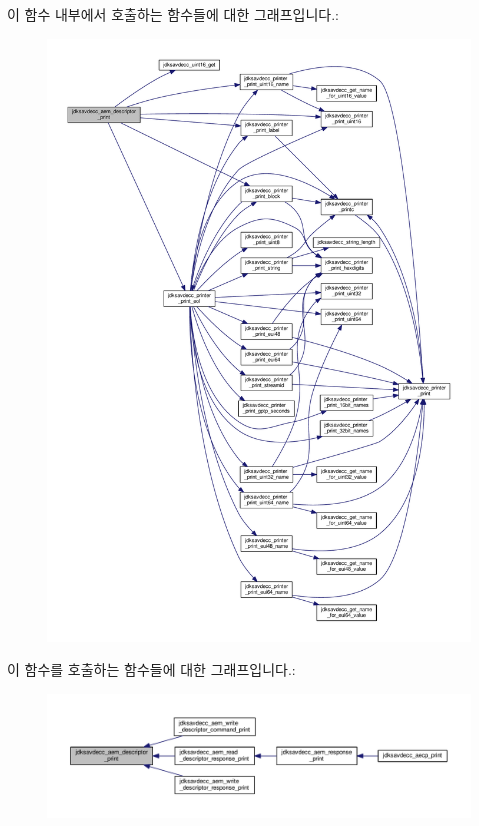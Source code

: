이 함수 내부에서 호출하는 함수들에 대한 그래프입니다.\+:
\nopagebreak
\begin{figure}[H]
\begin{center}
\leavevmode
\includegraphics[width=350pt]{group__aem__print_gadd626df0712b38901c31f452c182ee82_cgraph}
\end{center}
\end{figure}




이 함수를 호출하는 함수들에 대한 그래프입니다.\+:
\nopagebreak
\begin{figure}[H]
\begin{center}
\leavevmode
\includegraphics[width=350pt]{group__aem__print_gadd626df0712b38901c31f452c182ee82_icgraph}
\end{center}
\end{figure}



